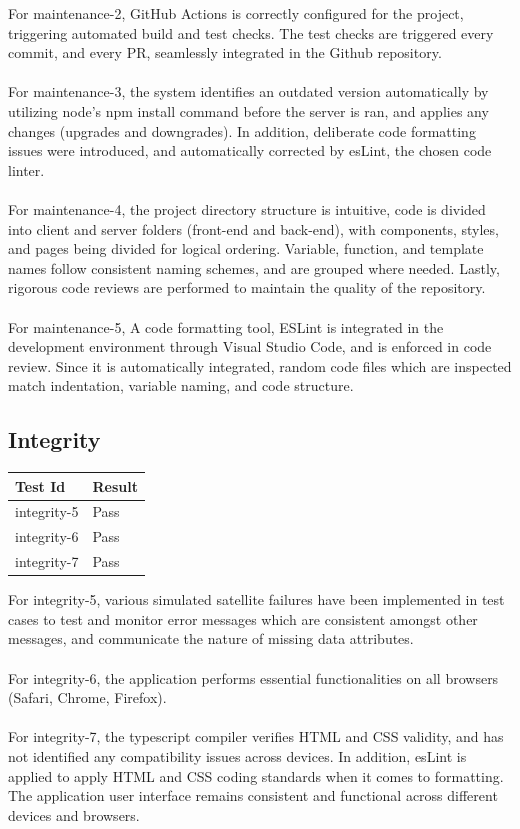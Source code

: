 \documentclass[12pt, titlepage]{article}
\begin{document}
For maintenance-2, GitHub Actions is correctly configured for the project, triggering automated build and test checks. The test checks are triggered every commit, and every PR, seamlessly integrated in the Github repository.
\\ \\
For maintenance-3, the system identifies an outdated version automatically by utilizing node’s npm install command before the server is ran, and applies any changes (upgrades and downgrades). In addition, deliberate code formatting issues were introduced, and automatically corrected by esLint, the chosen code linter.
\\ \\
For maintenance-4, the project directory structure is intuitive, code is divided into client and server folders (front-end and back-end), with components, styles, and pages being divided for logical ordering. Variable, function, and template names follow consistent naming schemes, and are grouped where needed. Lastly, rigorous code reviews are performed to maintain the quality of the repository.
\\ \\
For maintenance-5, A code formatting tool, ESLint is integrated in the development environment through Visual Studio Code, and is enforced in code review. Since it is automatically integrated, random code files which are inspected match indentation, variable naming, and code structure.


\subsection{Integrity}

\begin{center}
\begin{tabular}{|p{4cm} | p{4cm}| }
\hline
\textbf{Test Id} & \textbf{Result} \\
\hline
integrity-5 & Pass \\
\hline
integrity-6 & Pass \\
\hline
integrity-7 & Pass \\
\hline

\end{tabular}
\end{center}

For integrity-5, various simulated satellite failures have been implemented in test cases to test and monitor error messages which are consistent amongst other messages, and communicate the nature of missing data attributes.
\\ \\
For integrity-6, the application performs essential functionalities on all browsers (Safari, Chrome, Firefox).
\\ \\
For integrity-7, the typescript compiler verifies HTML and CSS validity, and has not identified any compatibility issues across devices. In addition, esLint is applied to apply HTML and CSS coding standards when it comes to formatting. The application user interface remains consistent and functional across different devices and browsers.
		
\end{document}

